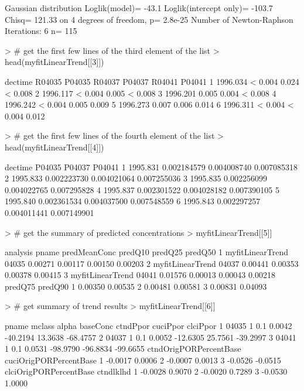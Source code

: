 \documentclass[11pt]{article}
\begin{document}
\begin{Schunk}
\begin{Soutput}
Gaussian distribution
Loglik(model)= -43.1   Loglik(intercept only)= -103.7
	Chisq= 121.33 on 4 degrees of freedom, p= 2.8e-25 
Number of Newton-Raphson Iterations: 6 
n= 115 
\end{Soutput}
\begin{Sinput}
> # get the first few lines of the third element of the list
> head(myfitLinearTrend[[3]])
\end{Sinput}
\begin{Soutput}
   dectime R04035 P04035 R04037 P04037 R04041 P04041
1 1996.034      <  0.004         0.024      <  0.008
2 1996.117      <  0.004         0.005      <  0.008
3 1996.201         0.005         0.004      <  0.008
4 1996.242      <  0.004         0.005         0.009
5 1996.273         0.007         0.006         0.014
6 1996.311      <  0.004      <  0.004         0.012
\end{Soutput}
\begin{Sinput}
> # get the first few lines of the fourth element of the list
> head(myfitLinearTrend[[4]])
\end{Sinput}
\begin{Soutput}
   dectime      P04035      P04037      P04041
1 1995.831 0.002184579 0.004008740 0.007085318
2 1995.833 0.002223730 0.004021064 0.007255036
3 1995.835 0.002256099 0.004022765 0.007295828
4 1995.837 0.002301522 0.004028182 0.007390105
5 1995.840 0.002361534 0.004037500 0.007548559
6 1995.843 0.002297257 0.004011441 0.007149901
\end{Soutput}
\begin{Sinput}
> # get the summary of predicted concentrations
> myfitLinearTrend[[5]]
\end{Sinput}
\begin{Soutput}
          analysis pname predMeanConc predQ10 predQ25 predQ50
1 myfitLinearTrend 04035      0.00271 0.00117 0.00150 0.00203
2 myfitLinearTrend 04037      0.00441 0.00353 0.00378 0.00415
3 myfitLinearTrend 04041      0.01576 0.00013 0.00043 0.00218
  predQ75 predQ90
1 0.00350 0.00535
2 0.00481 0.00581
3 0.00831 0.04093
\end{Soutput}
\begin{Sinput}
> # get summary of trend results
> myfitLinearTrend[[6]]
\end{Sinput}
\begin{Soutput}
  pname mclass alpha baseConc ctndPpor cuciPpor clciPpor
1 04035      1   0.1   0.0042 -40.2194  13.3638 -68.4757
2 04037      1   0.1   0.0052 -12.6305  25.7561 -39.2997
3 04041      1   0.1   0.0531 -98.9790 -96.8834 -99.6655
  ctndOrigPORPercentBase cuciOrigPORPercentBase
1                -0.0017                 0.0006
2                -0.0007                 0.0013
3                -0.0526                -0.0515
  clciOrigPORPercentBase ctndlklhd
1                -0.0028    0.9070
2                -0.0020    0.7289
3                -0.0530    1.0000
\end{Soutput}
\end{Schunk}
\end{document}
